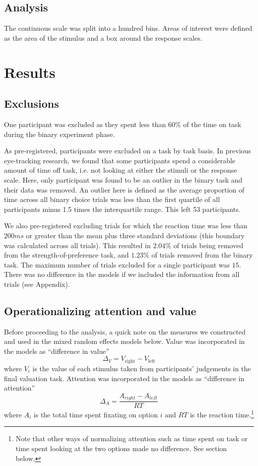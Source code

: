 \documentclass[12pt]{article}
\begin{document}
\subsection{Analysis}
The continuous scale was split into a hundred bins. Areas of interest were defined as the area of the stimulus and a box around the response scales. 

\section{Results}

\subsection{Exclusions}
One participant was excluded as they spent less than 60\% of the time on task during the binary experiment phase. 

As pre-registered, participants were excluded on a task by task basis. In previous eye-tracking research, we found that some participants spend a considerable amount of time off task, i.e. not looking at either the stimuli or the response scale. Here, only participant was found to be an outlier in the binary task and their data was removed. An outlier here is defined as the average proportion of time across all binary choice trials was less than the first quartile of all participants minus 1.5 times the interquartile range. This left 53 participants. 

We also pre-registered excluding trials for which the reaction time was less than $200ms$ or greater than the mean plus three standard deviations (this boundary was calculated across all trials). This resulted in $2.04\%$ of trials being removed from the strength-of-preference task, and $1.23\%$ of trials removed from the binary task. The maximum number of trials excluded for a single participant was $15$. There was no difference in the models if we included the information from all trials (see Appendix). 

\subsection{Operationalizing attention and value}
Before proceeding to the analysis, a quick note on the measures we constructed and used in the mixed random effects models below. Value was incorporated in the models as ``difference in value'' 
\begin{equation}
	\Delta_V = V_\text{right} - V_\text{left}	
\end{equation}
where $V_i$ is the value of each stimulus taken from participants' judgements in the final valuation task. Attention was incorporated in the models as ``difference in attention''
\begin{equation}
	\Delta_A = \frac{A_{right}-A_{left}}{RT}	
\end{equation}
where $A_i$ is the total time spent fixating on option $i$ and $RT$ is the reaction time.\footnote{Note that other ways of normalizing attention such as time spent on task or time spent looking at the two options made no difference. See section below.}
\end{document}
